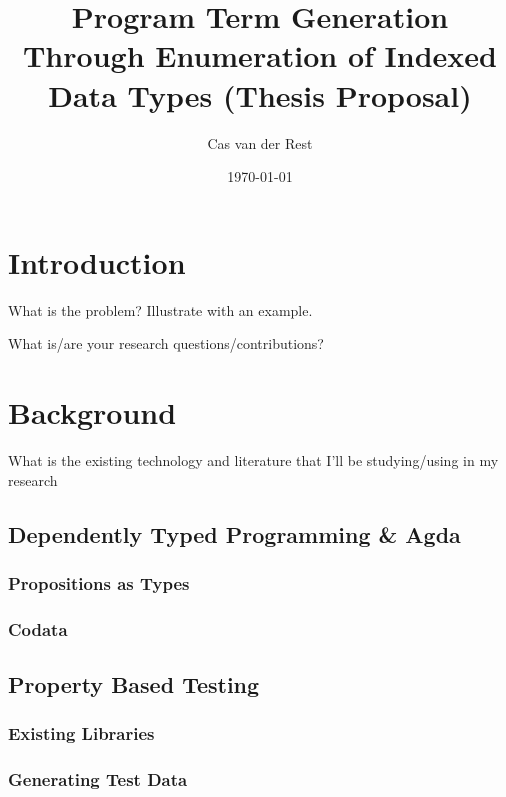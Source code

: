 \documentclass[11pt]{article}
\title{Program Term Generation Through Enumeration of Indexed Data Types (Thesis Proposal)}
\author{Cas van der Rest}
\date{\today}
\begin{document}
\maketitle

\tableofcontents 

\newpage

\section{Introduction}

What is the problem? Illustrate with an example. \cite{runciman2008smallcheck, altenkirch2003generic}

What is/are your research questions/contributions? \cite{claessen2011quickcheck}

\section{Background}

What is the existing technology and literature that I'll be
studying/using in my research \cite{denes2014quickchick, yorgey2010species, loh2011generic, norell2008dependently}

\subsection{Dependently Typed Programming \& Agda}

\subsubsection{Propositions as Types}

\subsubsection{Codata}

\subsection{Property Based Testing}

\subsubsection{Existing Libraries}

\subsubsection{Generating Test Data}
\end{document}
